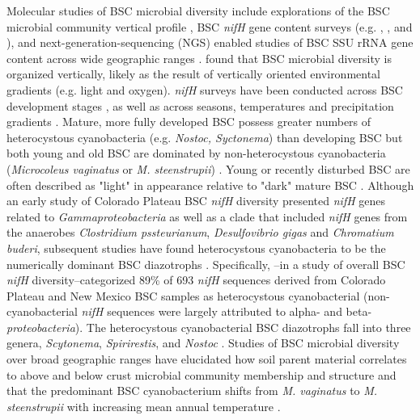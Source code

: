 Molecular studies of BSC microbial diversity include explorations of the BSC
microbial community vertical profile \citep{Garcia_Pichel_2003}, BSC
\textit{nifH} gene content surveys (e.g. \citet{14766579}, \citet{Yeager_2012},
\citet{Yeager} and \citet{Steppe_1996}), and next-generation-sequencing (NGS)
enabled studies of BSC SSU rRNA gene content across wide geographic ranges
\citep{Garcia_Pichel_2013, Steven_2013}. \citet{Garcia_Pichel_2003} found that
BSC microbial diversity is organized vertically, likely as the result of
vertically oriented environmental gradients (e.g. light and oxygen).
\textit{nifH} surveys have been conducted across BSC development stages
\citep{14766579}, as well as across seasons, temperatures and precipitation
gradients \citep{Yeager_2012}. Mature, more fully developed BSC possess greater
numbers of heterocystous cyanobacteria (e.g. \textit{Nostoc, Syctonema}) than
developing BSC but both young and old BSC are dominated by non-heterocystous
cyanobacteria (\textit{Microcoleus vaginatus} or \textit{M. steenstrupii})
\citep{14766579, Garcia_Pichel_2013}. Young or recently disturbed BSC are often
described as "light" in appearance relative to "dark" mature BSC
\citep{Belnap_2002, 14766579}.  Although an early study of Colorado Plateau BSC
\textit{nifH} diversity presented \textit{nifH} genes related to
\textit{Gammaproteobacteria} as well as a clade that included \textit{nifH}
genes from the anaerobes \textit{Clostridium pssteurianum},
\textit{Desulfovibrio gigas} and \textit{Chromatium buderi}, subsequent studies
have found heterocystous cyanobacteria to be the numerically dominant BSC
diazotrophs \citep{Yeager, 14766579, Yeager_2012}. Specifically,
\citet{Yeager}--in a study of overall BSC \textit{nifH} diversity--categorized
89\% of 693 \textit{nifH} sequences derived from Colorado Plateau and New
Mexico BSC samples as heterocystous cyanobacterial (non-cyanobacterial
\textit{nifH} sequences were largely attributed to alpha- and beta-
\textit{proteobacteria}). The heterocystous cyanobacterial BSC diazotrophs fall
into three genera, \textit{Scytonema}, \textit{Spirirestis}, and
\textit{Nostoc} \citep{Yeager, Yeager_2012}. Studies of BSC microbial diversity
over broad geographic ranges have elucidated how soil parent material
correlates to above and below crust microbial community membership and
structure \citep{Steven_2013} and that the predominant BSC cyanobacterium shifts
from \textit{M. vaginatus} to \textit{M. steenstrupii} with increasing mean
annual temperature \citep{Garcia_Pichel_2013}.

